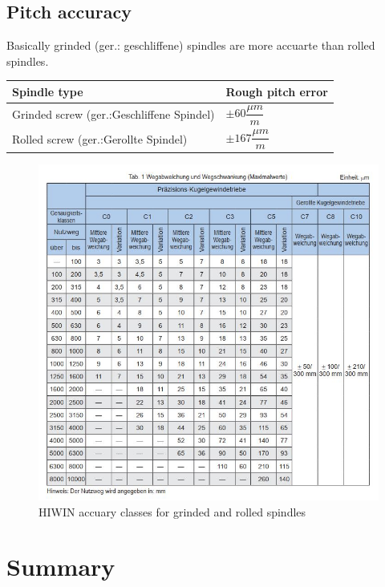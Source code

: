 		\subsection{Pitch accuracy}
			Basically grinded (ger.: geschliffene) spindles are more accuarte than rolled spindles. 
			\begin{table}[h!]\centering
				{\def\arraystretch{2}\tabcolsep=10pt
					\begin{tabular}{l|l}
						\textbf{Spindle type} & \textbf{Rough pitch error}\\
						\hline
						Grinded screw (ger.:Geschliffene Spindel) & $ \pm 60 \dfrac{\mu m}{m}$\\
						Rolled screw (ger.:Gerollte Spindel) & $ \pm 167 \dfrac{\mu m}{m}$\\ 
					\end{tabular}
			}\end{table}
			\begin{figure}[h!]
				\centering
				\includegraphics[width=1.0\linewidth]{./pics/spindle_accuracy.jpg}
				\caption{HIWIN accuary classes for grinded and rolled spindles}
			\end{figure}
		
\section{Summary}

